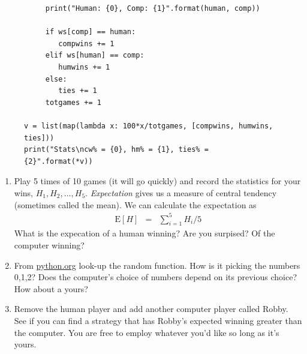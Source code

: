 \documentclass{article}
\begin{document}
\begin{enumerate}
\begin{figure}[h]
{\begin{verbatim}
     print("Human: {0}, Comp: {1}".format(human, comp))

     if ws[comp] == human:
        compwins += 1
     elif ws[human] == comp:
        humwins += 1
     else:
        ties += 1
     totgames += 1

v = list(map(lambda x: 100*x/totgames, [compwins, humwins, ties]))
print("Stats\ncw% = {0}, hm% = {1}, ties% = {2}".format(*v))
\end{verbatim}}
\end{figure}
\begin{enumerate}
\item Play 5 times of 10 games (it will go quickly) and record the statistics for your wins, $H_1, H_2, \ldots, H_5$.   {\it Expectation} gives us a measure of central tendency (sometimes called the mean).  We can calculate the expectation as
\begin{eqnarray*}
\mathrm{E}[H] &=& \sum_{i=1}^5 H_i/5
\end{eqnarray*}
What is the expecation of a human winning? Are you surpised? Of the computer winning?
\item From \url{python.org} look-up the random function.  How is it picking the numbers 0,1,2?  Does the computer's choice of numbers depend on its previous choice? How about a yours?
\item Remove the human player and add another computer player called Robby.  See if you can find a strategy that has Robby's expected winning greater than the computer.  You are free to employ whatever you'd like so long as it's yours.

\end{enumerate}
\end{enumerate}
\end{document}
